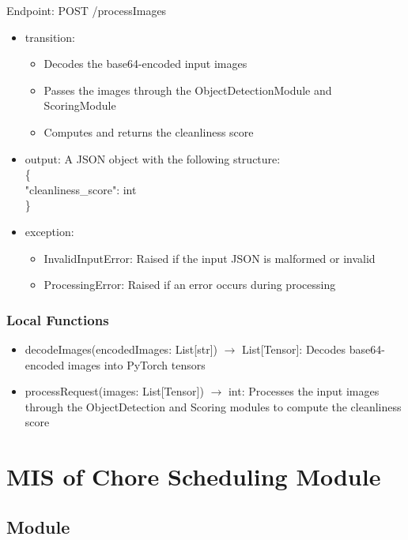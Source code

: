 \documentclass[12pt, titlepage]{article}
\begin{document}
\noindent Endpoint: POST /processImages
\begin{itemize}
\item transition:
\begin{itemize}
  \item Decodes the base64-encoded input images
  \item Passes the images through the ObjectDetectionModule and ScoringModule
  \item Computes and returns the cleanliness score
\end{itemize}
\item output: A JSON object with the following structure: \\ \{ \\"cleanliness{\_}score": int\\ \}
\item exception: 
\begin{itemize}
  \item InvalidInputError: Raised if the input JSON is malformed or invalid
  \item ProcessingError: Raised if an error occurs during processing
\end{itemize}

\end{itemize}


\subsubsection{Local Functions}

\begin{itemize}
  \item decodeImages(encodedImages: List[str]) $\rightarrow$ List[Tensor]: Decodes base64-encoded images into PyTorch tensors
  \item processRequest(images: List[Tensor]) $\rightarrow$ int: Processes the input images through the ObjectDetection and Scoring modules to compute the cleanliness score
\end{itemize}

\newpage


\section{MIS of Chore Scheduling Module} \label{Module} 

\subsection{Module}
\end{document}
